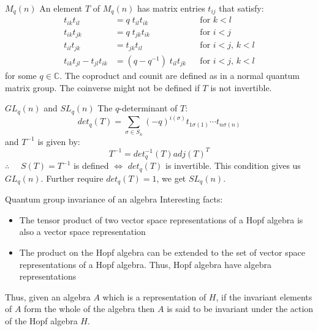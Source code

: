 \documentclass[pdf,colorBG,slideColor,fyma]{prosper}
\def\IC{\mathbb{C}}
\begin{document}
\begin{slide}{$M_q(n)$}
An element $T$ of $M_q(n)$ has matrix entries $t_{ij}$ that satisfy:
\begin{align*}
t_{ik} t_{il} & = q \; t_{il} t_{ik} & &\text{for $k < l$} \\
t_{ik} t_{jk} & = q \; t_{jk} t_{ik} & &\text{for $i < j$} \\
t_{il} t_{jk} & = t_{jk} t_{il} & &\text{for $i  < j$, $k < l$} \\
t_{ik} t_{jl} - t_{jl} t_{ik} & = (q - q^{-1}) \; t_{il} t_{jk} & &\text{for $i  < j$, $k < l$}
\end{align*}
for some $q \in \IC$.
\break
\break
The coproduct and counit are defined as in a normal quantum matrix group.
\break
\break
The coinverse might not be defined if $T$ is not invertible.

\end{slide}


\begin{slide}{$GL_q(n)$ and $SL_q(n)$}
The $q$-determinant of $T$:
\[
det_q(T) = \sum_{\sigma \in S_n} (-q)^{i(\sigma)} t_{1\sigma(1)} \cdots t_{n\sigma(n)}
\]
and $T^{-1}$ is given by:
\[
T^{-1} = det_q^{-1}(T) adj(T)^T
\]
$\therefore\quad$ $S(T) = T^{-1}$ is defined $\Leftrightarrow$ $det_q(T)$ is invertible.
\break
\break
This condition gives us $GL_q(n)$.
\break
\break
Further require $det_q(T) = 1$, we get $SL_q(n)$.
\end{slide}


\begin{slide}{Quantum group invariance of an algebra}
Interesting facts:
\begin{itemize}
  \item{The tensor product of two vector space representations of a Hopf algebra is also
    a vector space representation}
  \item{The product on the Hopf algebra can be extended to the set of vector space
    representations of a Hopf algebra. Thus, Hopf algebra have algebra representations}
\end{itemize}

Thus, given an algebra $A$ which is a representation of $H$, if the invariant elements of $A$ form the
whole of the algebra then $A$ is said to be invariant under the action of the Hopf algebra $H$.
\end{slide}
\end{document}

